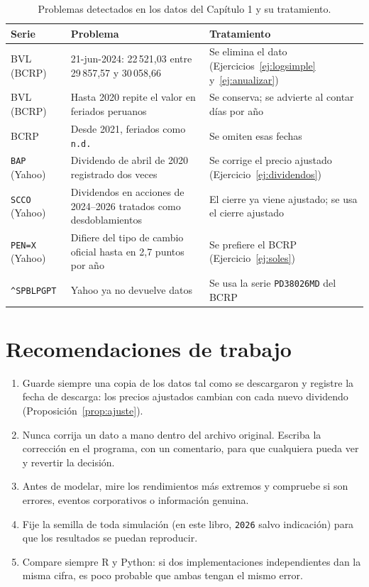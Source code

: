 \begin{table}[H]
\centering\small
\begin{tabularx}{\linewidth}{@{}lXX@{}}
\toprule
Serie & Problema & Tratamiento \\
\midrule
BVL (BCRP) & 21-jun-2024: 22\,521,03 entre 29\,857,57 y 30\,058,66 & Se elimina el dato (Ejercicios~\ref{ej:logsimple} y~\ref{ej:anualizar}) \\
BVL (BCRP) & Hasta 2020 repite el valor en feriados peruanos & Se conserva; se advierte al contar días por año \\
BCRP & Desde 2021, feriados como \texttt{n.d.} & Se omiten esas fechas \\
\texttt{BAP} (Yahoo) & Dividendo de abril de 2020 registrado dos veces & Se corrige el precio ajustado (Ejercicio~\ref{ej:dividendos}) \\
\texttt{SCCO} (Yahoo) & Dividendos en acciones de 2024--2026 tratados como desdoblamientos & El cierre ya viene ajustado; se usa el cierre ajustado \\
\texttt{PEN=X} (Yahoo) & Difiere del tipo de cambio oficial hasta en 2,7 puntos por año & Se prefiere el BCRP (Ejercicio~\ref{ej:soles}) \\
\texttt{\^{}SPBLPGPT} & Yahoo ya no devuelve datos & Se usa la serie \texttt{PD38026MD} del BCRP \\
\bottomrule
\end{tabularx}
\caption{Problemas detectados en los datos del Capítulo 1 y su tratamiento.}
\label{tab:problemasdatos}
\end{table}

\section{Recomendaciones de trabajo}

\begin{enumerate}[leftmargin=*]
  \item Guarde siempre una copia de los datos tal como se descargaron y registre la fecha de descarga: los
        precios ajustados cambian con cada nuevo dividendo (Proposición~\ref{prop:ajuste}).
  \item Nunca corrija un dato a mano dentro del archivo original. Escriba la corrección en el programa,
        con un comentario, para que cualquiera pueda ver y revertir la decisión.
  \item Antes de modelar, mire los rendimientos más extremos y compruebe si son errores, eventos
        corporativos o información genuina.
  \item Fije la semilla de toda simulación (en este libro, \texttt{2026} salvo indicación) para que los
        resultados se puedan reproducir.
  \item Compare siempre R y Python: si dos implementaciones independientes dan la misma cifra, es poco
        probable que ambas tengan el mismo error.
\end{enumerate}
